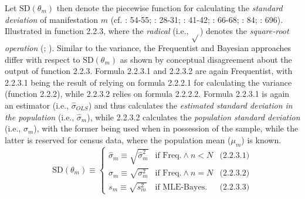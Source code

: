 \documentclass[
  10pt,
  a4paper,
  twoside]{article}
\begin{document}
Let \(\text{SD}(\theta_m)\) then denote the piecewise function for calculating the \emph{standard deviation} of manifestation \(m\) (cf. : 54-55; : 28-31; : 41-42; : 66-68; : 84; : 696). Illustrated in function 2.2.3, where the \emph{radical} (i.e., \(\sqrt{}\)) denotes the \emph{square-root operation} (; ). Similar to the variance, the Frequentist and Bayesian approaches differ with respect to \(\text{SD}(\theta_m)\) as shown by conceptual disagreement about the output of function 2.2.3. Formula 2.2.3.1 and 2.2.3.2 are again Frequentist, with 2.2.3.1 being the result of relying on formula 2.2.2.1 for calculating the variance (function 2.2.2), while 2.2.3.2 relies on formula 2.2.2.2. Formula 2.2.3.1 is again an estimator (i.e., \(\hat{\sigma}_{OLS}\)) and thus calculates the \emph{estimated standard deviation in the population} (i.e., \(\hat{\sigma}_m\)), while 2.2.3.2 calculates the \emph{population standard deviation} (i.e., \(\sigma_m\)), with the former being used when in possession of the sample, while the latter is reserved for census data, where the population mean (\(\mu_m\)) is known.
\[
\text{SD}(\theta_m) \equiv
\left\{
\begin{array}{lll}
  \hat{\sigma}_m \equiv \sqrt{\hat{\sigma}^2_m} & \text{if Freq.} \land n < N & \text{(2.2.3.1)} \\
  \sigma_m \equiv \sqrt{\sigma^2_m} & \text{if Freq.} \land n = N & \text{(2.2.3.2)} \\
  s_m \equiv \sqrt{s^2_m} & \text{if MLE-Bayes.} & \text{(2.2.3.3)}
\end{array}
\right.
\tag{2.2.3}
\]
\end{document}
